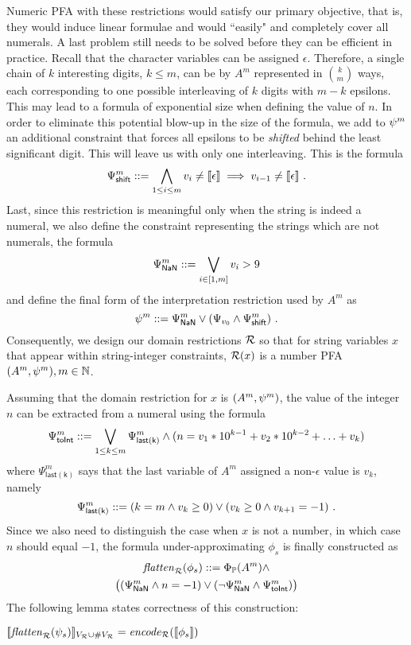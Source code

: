 \documentclass[sigplan,screen]{acmart}
\begin{document}
Numeric PFA with these restrictions would satisfy our primary objective, that is, they would induce linear formulae and would ``easily" and completely cover all numerals.
%
A last problem still needs to be solved before they can be efficient in practice. 
%
Recall that the character variables can be assigned $\epsilon$.  
%
Therefore, a single chain of $k$ interesting digits, $k\leq m$, can be by $A^m$ represented in $k\choose m$ ways, each corresponding to one possible interleaving of $k$ digits with $m-k$ epsilons. 
%
%
This may  lead to a formula of   exponential size  when defining  the value of $n$.
%
In order to eliminate this potential blow-up in the size of the formula, we add to $\psi^m$ an additional constraint that forces all epsilons to be \emph{shifted} behind the least significant digit. This will leave us with only one interleaving. This is the formula
$$
\Psi_{\mathsf{shift}}^m ::= \bigwedge_{1\leq i \leq m} v_i \neq [\![\epsilon]\!] \implies v_{i-1}\neq [\![\epsilon]\!] \ .
$$
Last, since this restriction is meaningful only when the string is indeed a numeral,  
we also define the constraint representing the strings which are not numerals, the formula
$$
\Psi_{\mathsf{NaN}}^m ::=  \bigvee_{i\in [1,m]} v_i>9
$$ 
and define the final form of the interpretation restriction used by $A^m$ as 
$$
\psi^m ::=  \Psi_{\mathsf{NaN}}^m \lor (\Psi_{v_0} \land \Psi_{\mathsf{shift}}^m)\ .
$$
Consequently, we design our domain restrictions $\mathcal{R}$ so that for string variables $x$ that appear within string-integer constraints,  $\mathcal{R}(x)$ is a number PFA $(A^m,\psi^m),m\in \mathbb{N}$. 

Assuming that the domain restriction for $x$ is $(A^m,\psi^m)$, 
the value of the integer $n$ can be extracted from a numeral using the formula
$$
\Psi_{\mathsf{toInt}}^m::= \bigvee_{1\leq k \leq m} \Psi_{\mathsf{last(k)}}^m \land (n = v_1* 10^{k-1} + v_2* 10^{k-2} + \ldots + v_{k})
$$
where $\Psi_{\mathsf{last(k)}}^m$ says that the last variable of $A^m$ assigned a non-$\epsilon$ value is $v_{k}$, namely 
$$
\Psi_{\mathsf{last(k)}}^m ::= (k = m \land v_k \geq 0) \lor (v_{k} \geq 0 \land v_{k+1} = -1)\ .
$$
Since we also need to distinguish the case when $x$ is not a number, in which case $n$ should equal $-1$, 
the formula under-approximating $\phi_s$ is finally constructed as  
\begin{multline*}
\mathit{flatten}_{\mathcal{R}}(\phi_s) 
::= 
\Phi_{\mathbb{P}}(A^m) 
\land \\
\bigl((\Psi_{\mathsf{NaN}}^m \land n = -1) 
\lor 
(\neg\Psi_{\mathsf{NaN}}^m \land \Psi_{\mathsf{toInt}}^m)\bigr)
\end{multline*}
The following lemma states correctness of this construction:
\begin{lemma}
$
[\![\mathit{flatten}_{\mathcal{R}}(\psi_s) ]\!]_{V_{\mathcal{R}} \cup \#V_{\mathcal{R}}} = \mathit{encode}_{\mathcal{R}}([\![\phi_s]\!])
$
\end{lemma}
\end{document}
